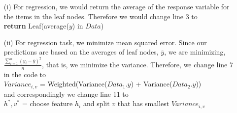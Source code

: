 \begin{answer}
\newpage
\begin{enumerate}
	\item[(i)] For regression, we would return the average of the response variable for the items in the leaf nodes. Therefore we would change line 3 to\\ \textbf{return} Leaf(average($y$) in $Data$)
 \item[(ii)] For regression task, we minimize mean squared error. Since our predictions are based on the averages of leaf nodes, $\bar{y}$, we are minimizing, $\frac{\sum_{i=1}^{n} (y_i-\bar{y})^2}{n}$, that is, we minimize the variance. Therefore, we change line 7 in the code to\\
 $Variance_{i, v}$ = Weighted(Variance($Data_1.y$) + Variance($Data_2.y$))\\
 and correspondingly we change line 11 to \\
 $h^*, v^*$ = choose feature $h_i$ and split $v$ that has smallest $Variance_{i, v}$
\end{enumerate}
\end{answer}